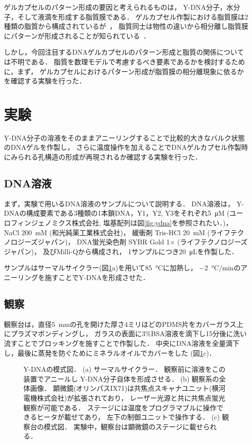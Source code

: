 ゲルカプセルのパターン形成の要因と考えられるものは，
Y-DNA分子，水分子，そして液滴を形成する脂質膜である．
ゲルカプセル作製における脂質膜は2種類の脂質から構成されているが~\cite{morita2017formation}，
脂質同士は物性の違いから相分離し脂質膜にパターンが形成されることが知られている~\cite{yanagisawa2014multiple}．

しかし，今回注目するDNAゲルカプセルのパターン形成と脂質の関係については不明である．
脂質を数理モデルで考慮するべき要素であるかを検討するために，まず，
ゲルカプセルにおけるパターン形成が脂質膜の相分離現象に依るかを確認する実験を行った．


\section{実験}
Y-DNA分子の溶液をそのままアニーリングすることで比較的大きなバルク状態のDNAゲルを作製し，
さらに温度操作を加えることでDNAゲルカプセル作製時にみられる孔構造の形成が再現されるか確認する実験を行った．


\subsection{DNA溶液}
まず，実験で用いるDNA溶液のサンプルについて説明する．
DNA溶液は，
Y-DNAの構成要素である3種類の1本鎖DNA，Y1，Y2, Y3をそれぞれ\SI{5}{\micro M} (ユーロフィンジェノミクス株式会社, 塩基配列は図\ref{fig:ydna}を参照されたい．)，
NaCl \SI{200}{mM} (和光純薬工業株式会社)，
緩衝剤 Tris-HCl \SI{20}{mM} (ライフテクノロジーズジャパン)，
DNA蛍光染色剤 SYBR Gold 1× (ライフテクノロジーズジャパン)，
及びMilli-Qから構成され，
1サンプルにつき\SI{20}{\micro L}を作製した．

サンプルはサーマルサイクラー(図\ref{fig:equipments}a)を用いて\SI{85}{\celsius}に加熱し，
\SI{-2}{\celsius/min}のアニーリングを施すことでY-DNAを形成させた．


\subsection{観察}
観察台は，直径\SI{5}{mm}の孔を開けた厚さ4ミリほどのPDMS片をカバーガラス上にプラズマボンディングし，
ガラスの表面に3\%BSA溶液を滴下し15分後に洗い流すことでブロッキングを施すことで作製した．
中央にDNA溶液を全量滴下し，最後に蒸発を防ぐためにミネラルオイルでカバーをした
(図\ref{fig:equipments}c)．
\begin{figure}
    \centering
    
    \caption{Y-DNAの模式図．
        (a) サーマルサイクラー．
            観察前に溶液をこの装置でアニールし
            Y-DNA分子自体を形成させる．
        (b) 観察系の全体画像．
            顕微鏡(オリンパスIX71)は共焦点スキャナユニット(横河電機株式会社)が拡張されており，
            レーザー光源と共に共焦点蛍光観察が可能である．
            ステージには温度をプログラマブルに操作できるヒータが載せてあり，
            左下の制御ユニットで操作する．
        (c) 観察台の模式図．
            実験中，観察台は顕微鏡のステージに載せられる．
    }
    \label{fig:equipments}
\end{figure}

